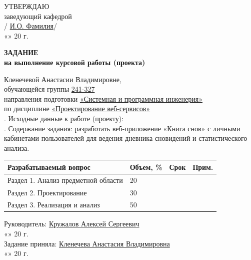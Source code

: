 \documentclass[14pt, a4paper]{extarticle}
\begin{document}
\begin{flushright}
УТВЕРЖДАЮ\\
заведующий кафедрой\\[12pt]
\underline{\hspace{3cm}} / \underline{И.О. Фамилия}/\\[6pt]
«\underline{\hspace{1cm}}» \underline{\hspace{3cm}} 20\underline{\hspace{0.5cm}} г.
\end{flushright}

\vspace{24pt}

\centering
\textbf{ЗАДАНИЕ}\\[12pt]
\textbf{на выполнение курсовой работы (проекта)}\\[24pt]

\raggedright
Кленечевой Анастасии Владимировне,\\[6pt]
обучающейся группы \underline{241-327}\\[6pt]
направления подготовки \underline{«Системная и программная инженерия»}\\[6pt]
по дисциплине \underline{«Проектирование веб-сервисов»}\\[24pt]

. Исходные данные к работе (проекту):\\[12pt]

. Содержание задания: разработать веб-приложение «Книга снов» с личными кабинетами пользователей для ведения дневника сновидений и статистического анализа.\\[12pt]

\noindent
\begin{tabular}{|p{5cm}|p{2.2cm}|p{2.5cm}|p{3cm}|}
\hline
\textbf{Разрабатываемый вопрос} & \textbf{Объем, \%} & \textbf{Срок} & \textbf{Прим.} \\
\hline
Раздел 1. Анализ предметной области & 20 & & \\
\hline
Раздел 2. Проектирование & 30 & & \\
\hline
Раздел 3. Реализация и анализ & 50 & & \\
\hline
\end{tabular}

\vspace{48pt}

\noindent
Руководитель: \underline{Кружалов Алексей Сергеевич}\\[12pt]
«\underline{\hspace{1cm}}» \underline{\hspace{3cm}} 20\underline{\hspace{0.5cm}} г.\\[24pt]

\noindent
Задание приняла: \underline{Кленечева Анастасия Владимировна}\\[6pt]
«\underline{\hspace{1cm}}» \underline{\hspace{3cm}} 20\underline{\hspace{0.5cm}} г.

\newpage

\tableofcontents
\end{document}
